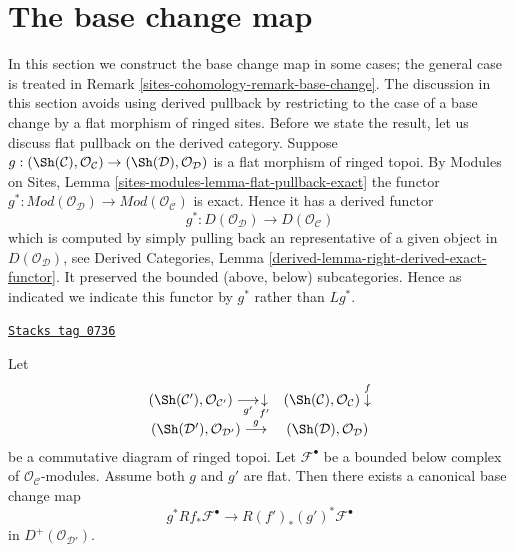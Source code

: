 \section{The base change map}
\label{sites-cohomology-section-base-change-map}
In this section we construct the base change map in some cases;
the general case is treated in Remark \ref{sites-cohomology-remark-base-change}.
The discussion in this section avoids using
derived pullback by restricting to the case of a base change
by a flat morphism of ringed sites.
Before we state the result, let us discuss flat pullback on the derived
category. Suppose
$g : (\Sh(\mathcal{C}), \mathcal{O}_\mathcal{C})
\to (\Sh(\mathcal{D}), \mathcal{O}_\mathcal{D})$
is a flat morphism of ringed topoi. By
Modules on Sites, Lemma \ref{sites-modules-lemma-flat-pullback-exact}
the functor $g^* : \textit{Mod}(\mathcal{O}_\mathcal{D}) \to
\textit{Mod}(\mathcal{O}_\mathcal{C})$ is exact.
Hence it has a derived functor
$$
g^* : D(\mathcal{O}_\mathcal{D}) \to D(\mathcal{O}_\mathcal{C})
$$
which is computed by simply pulling back an representative of a given
object in $D(\mathcal{O}_\mathcal{D})$, see
Derived Categories, Lemma \ref{derived-lemma-right-derived-exact-functor}.
It preserved the bounded (above, below) subcategories.
Hence as indicated we indicate this functor by $g^*$ rather than $Lg^*$.

\begin{lemma}
\label{sites-cohomology-lemma-base-change-map-flat-case}
\href{https://stacks.math.columbia.edu/tag/0736}{\texttt{Stacks tag 0736}}

Let
$$
\begin{array}{cc}(\Sh(\mathcal{C}'), \mathcal{O}_{\mathcal{C}'})
\underset{g'}{\longrightarrow}\underset{f'}{\downarrow} & (\Sh(\mathcal{C}), \mathcal{O}_\mathcal{C}) \overset{f}{\downarrow} \\ (\Sh(\mathcal{D}'), \mathcal{O}_{\mathcal{D}'})
\overset{g}{\longrightarrow} & (\Sh(\mathcal{D}), \mathcal{O}_\mathcal{D})\end{array}
$$
be a commutative diagram of ringed topoi.
Let $\mathcal{F}^\bullet$ be a bounded below complex of
$\mathcal{O}_\mathcal{C}$-modules.
Assume both $g$ and $g'$ are flat.
Then there exists a canonical base change map
$$
g^*Rf_*\mathcal{F}^\bullet
\longrightarrow
R(f')_*(g')^*\mathcal{F}^\bullet
$$
in $D^{+}(\mathcal{O}_{\mathcal{D}'})$.
\end{lemma}

